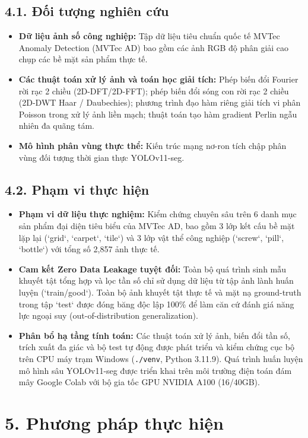 \subsection*{4.1. Đối tượng nghiên cứu}
\begin{itemize}
    \item \textbf{Dữ liệu ảnh số công nghiệp:} Tập dữ liệu tiêu chuẩn quốc tế MVTec Anomaly Detection (MVTec AD) bao gồm các ảnh RGB độ phân giải cao chụp các bề mặt sản phẩm thực tế.
    \item \textbf{Các thuật toán xử lý ảnh và toán học giải tích:} Phép biến đổi Fourier rời rạc 2 chiều (2D-DFT/2D-FFT); phép biến đổi sóng con rời rạc 2 chiều (2D-DWT Haar / Daubechies); phương trình đạo hàm riêng giải tích vi phân Poisson trong xử lý ảnh liền mạch; thuật toán tạo hàm gradient Perlin ngẫu nhiên đa quãng tám.
    \item \textbf{Mô hình phân vùng thực thể:} Kiến trúc mạng nơ-ron tích chập phân vùng đối tượng thời gian thực YOLOv11-seg.
\end{itemize}

\subsection*{4.2. Phạm vi thực hiện}
\begin{itemize}
    \item \textbf{Phạm vi dữ liệu thực nghiệm:} Kiểm chứng chuyên sâu trên 6 danh mục sản phẩm đại diện tiêu biểu của MVTec AD, bao gồm 3 lớp kết cấu bề mặt lặp lại (`grid`, `carpet`, `tile`) và 3 lớp vật thể công nghiệp (`screw`, `pill`, `bottle`) với tổng số 2,857 ảnh thực tế.
    \item \textbf{Cam kết Zero Data Leakage tuyệt đối:} Toàn bộ quá trình sinh mẫu khuyết tật tổng hợp và lọc tần số chỉ sử dụng dữ liệu từ tập ảnh lành huấn luyện (`train/good`). Toàn bộ ảnh khuyết tật thực tế và mặt nạ ground-truth trong tập `test` được đóng băng độc lập 100\% để làm căn cứ đánh giá năng lực ngoại suy (out-of-distribution generalization).
    \item \textbf{Phân bổ hạ tầng tính toán:} Các thuật toán xử lý ảnh, biến đổi tần số, trích xuất đa giác và bộ test tự động được phát triển và kiểm chứng cục bộ trên CPU máy trạm Windows (\texttt{./venv}, Python 3.11.9). Quá trình huấn luyện mô hình sâu YOLOv11-seg được triển khai trên môi trường điện toán đám mây Google Colab với bộ gia tốc GPU NVIDIA A100 (16/40GB).
\end{itemize}

\section*{5. Phương pháp thực hiện}

